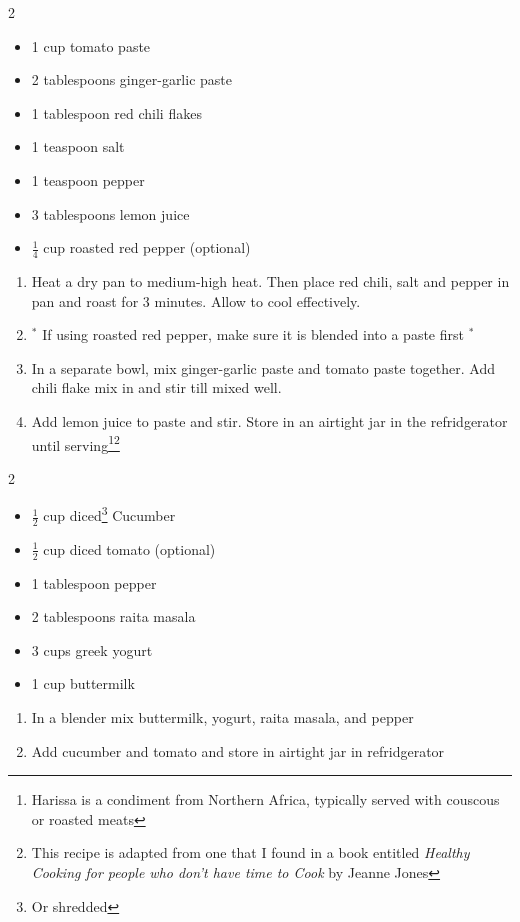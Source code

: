 \documentclass[oneside]{recipe}
\newcommand{\recipecolumn}[2]{
	\begin{multicols}{2}
	\raggedcolumns
	#1
	\columnbreak
	#2
	\end{multicols}
}
\begin{document}
\recipecolumn{
	\begin{itemize}
	\item 1 cup tomato paste
	\item 2 tablespoons ginger-garlic paste
	\item 1 tablespoon red chili flakes
	\item 1 teaspoon salt
	\item 1 teaspoon pepper
	\item 3 tablespoons lemon juice 
	\item $\frac{1}{4}$ cup roasted red pepper (optional)
	\end{itemize}
}{
	\begin{enumerate}
		\item Heat a dry pan to medium-high heat. Then place red chili, salt and pepper in pan and roast for 3 minutes. Allow to cool effectively.
		\item $^*$ If using roasted red pepper, make sure it is blended into a paste first $^*$
		\item In a separate bowl, mix ginger-garlic paste and tomato paste together. Add chili flake mix in and stir till mixed well. 
		\item Add lemon juice to paste and stir. Store in an airtight jar in the refridgerator until serving\footnote{Harissa is a condiment from Northern Africa, typically served with couscous or roasted meats}\footnote{This recipe is adapted from one that I found in a book entitled \textit{Healthy Cooking for people who don't have time to Cook} by Jeanne Jones}
	\end{enumerate}
}

\recipecolumn{
	\begin{itemize}	
		\item $\frac{1}{2}$ cup diced\footnote{Or shredded} Cucumber
		\item $\frac{1}{2}$ cup diced tomato (optional)
		\item 1 tablespoon pepper
		\item 2 tablespoons raita masala
		\item 3 cups greek yogurt
		\item 1 cup buttermilk
	\end{itemize}
}{
	\begin{enumerate}
		\item In a blender mix buttermilk, yogurt, raita masala, and pepper
		\item Add cucumber and tomato and store in airtight jar in refridgerator
	\end{enumerate}
}
\end{document}
